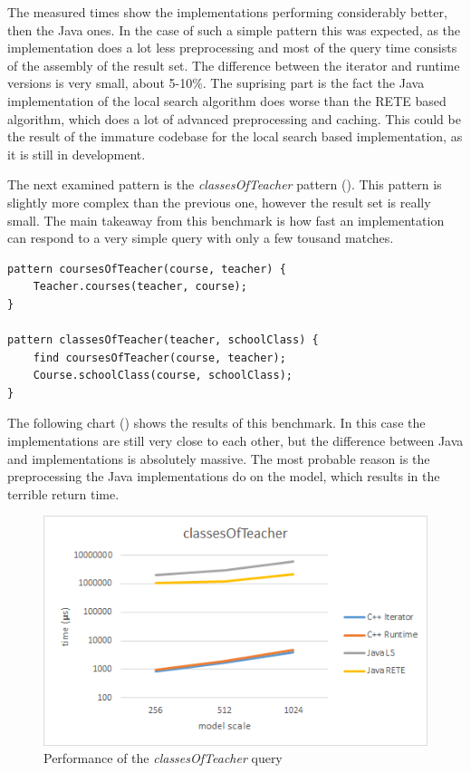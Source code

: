 The measured times show the \CPP{} implementations performing considerably
better, then the Java ones. In the case of such a simple pattern this was
expected, as the \CPP{} implementation does a lot less preprocessing and most of
the query time consists of the assembly of the result set. The difference
between the iterator and runtime versions is very small, about 5-10\%. The
suprising part is the fact the Java implementation of the local search algorithm
does worse than the RETE based algorithm, which does a lot of advanced
preprocessing and caching. This could be the result of the immature codebase for
the local search based implementation, as it is still in development.

The next examined pattern is the \emph{classesOfTeacher} pattern
(). This pattern is slightly more complex than
the previous one, however the result set is really small. The main takeaway from
this benchmark is how fast an implementation can respond to a very simple query
with only a few tousand matches.

\begin{lstlisting}[frame=single,float=!ht,language=IQPL,
label=listing:meas_classesOfTeacher, caption=The classesOfTeacher pattern]
pattern coursesOfTeacher(course, teacher) {
	Teacher.courses(teacher, course);
}

pattern classesOfTeacher(teacher, schoolClass) {
	find coursesOfTeacher(course, teacher);
	Course.schoolClass(course, schoolClass);
}
\end{lstlisting}

The following chart () shows the results of this
benchmark. In this case the \CPP{} implementations are still very close to each
other, but the difference between Java and \CPP{} implementations is absolutely
massive. The most probable reason is the preprocessing the Java implementations
do on the model, which results in the terrible return time. 

\begin{figure}[!ht]
\centering
\includegraphics[width=120mm,
keepaspectratio]{figures/meas_classesOfTeacher.png}
\caption{Performance of the \emph{classesOfTeacher} query}
\label{fig:meas_classesOfTeacher}
\end{figure}


